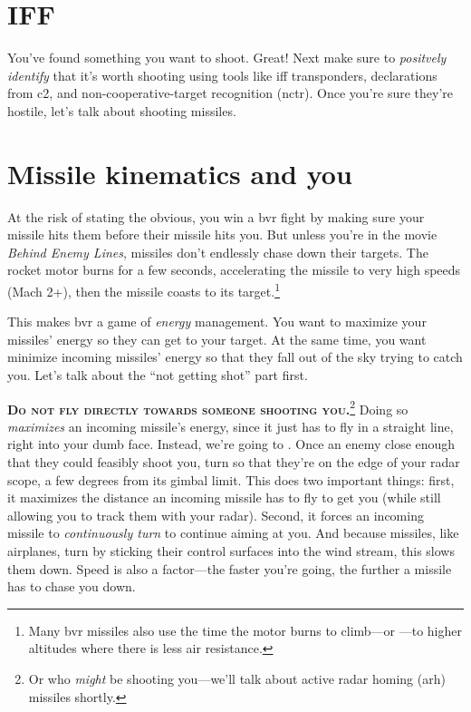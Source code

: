 \section{IFF}

You've found something you want to shoot. Great!
Next make sure to \emph{positvely identify}
that it's worth shooting using tools like
\ac{iff} transponders,
declarations from \ac{c2},
and non-cooperative-target recognition \ac{(nctr)}.
Once you're sure they're hostile, let's talk about shooting missiles.

\section{Missile kinematics and you}

At the risk of stating the obvious, you win a \ac{bvr} fight by making sure your
missile hits them before their missile hits you.
But unless you're in the movie \emph{Behind Enemy Lines},
missiles don't endlessly chase down their targets.
The rocket motor burns for a few seconds,
accelerating the missile to very high speeds (Mach 2+),
then the missile coasts to its target.\punckern\footnote{Many
\ac{bvr} missiles also use the time the motor burns to climb---or
---to higher altitudes where there is less air resistance.}

This makes \ac{bvr} a game of \emph{energy} management.
You want to maximize your missiles' energy so they can get to your target.
At the same time, you want minimize incoming missiles' energy
so that they fall out of the sky trying to catch you.
Let's talk about the ``not getting shot'' part first.

\textbf{\textsc{Do not fly directly towards someone shooting
you.}}\punckern\footnote{Or who \emph{might} be shooting you---we'll talk about
active radar homing \ac{(arh)} missiles shortly.}
Doing so \emph{maximizes} an incoming missile's energy,
since it just has to fly in a straight line, right into your dumb face.
Instead, we're going to .
Once an enemy close enough that they could feasibly shoot you,
turn so that they're on the edge of your radar scope,
a few degrees from its gimbal limit.
This does two important things:
first, it maximizes the distance an incoming missile has to fly to get you
(while still allowing you to track them with your radar).
Second, it forces an incoming missile to \emph{continuously turn} to
continue aiming at you.
And because missiles, like airplanes, turn by sticking their control surfaces
into the wind stream, this slows them down.
Speed is also a factor---the faster you're going,
the further a missile has to chase you down.

